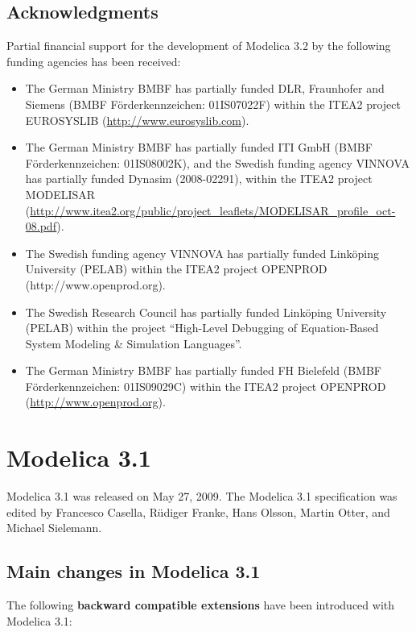 \documentclass[10pt,a4paper]{report}
\def\doublelabel#1{\label{#1}\hypertarget{#1}{}}
\begin{document}
\subsection{Acknowledgments}\doublelabel{acknowledgments2}

Partial financial support for the development of Modelica 3.2 by the
following funding agencies has been received:

\begin{itemize}
\item
  The German Ministry BMBF has partially funded DLR, Fraunhofer and
  Siemens (BMBF Förderkennzeichen: 01IS07022F) within the ITEA2 project
  EUROSYSLIB (\url{http://www.eurosyslib.com}).
\item
  The German Ministry BMBF has partially funded ITI GmbH (BMBF
  Förderkennzeichen: 01IS08002K), and the Swedish funding agency VINNOVA
  has partially funded Dynasim (2008-02291), within the ITEA2 project
  MODELISAR
  (\url{http://www.itea2.org/public/project_leaflets/MODELISAR_profile_oct-08.pdf}).
\item
  The Swedish funding agency VINNOVA has partially funded Linköping
  University (PELAB) within the ITEA2 project OPENPROD
  (http://www.openprod.org).
\item
  The Swedish Research Council has partially funded Linköping University
  (PELAB) within the project ``High-Level Debugging of Equation-Based
  System Modeling \& Simulation Languages''.
\item
  The German Ministry BMBF has partially funded FH Bielefeld (BMBF
  Förderkennzeichen: 01IS09029C) within the ITEA2 project OPENPROD
  (\href{http://www.openprod.}{http://www.openprod.org}).
\end{itemize}

\section{Modelica 3.1}\doublelabel{modelica-3-1}

Modelica 3.1 was released on May 27, 2009. The Modelica 3.1
specification was edited by Francesco Casella, Rüdiger Franke, Hans
Olsson, Martin Otter, and Michael Sielemann.

\subsection{Main changes in Modelica 3.1}\doublelabel{main-changes-in-modelica-3-1}

The following \textbf{backward compatible extensions} have been
introduced with Modelica 3.1:
\end{document}
